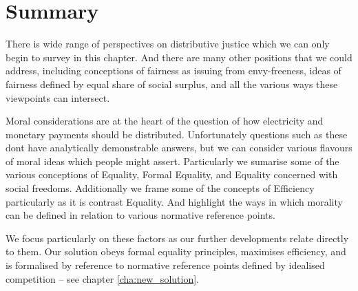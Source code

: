 \section{Summary}

There is wide range of perspectives on distributive justice which we can only begin to survey in this chapter.
And there are many other positions that we could address, including conceptions of fairness as issuing from envy-freeness, ideas of fairness defined by equal share of social surplus, and all the various ways these viewpoints can intersect.%

Moral considerations are at the heart of the question of how electricity and monetary payments should be distributed.
Unfortunately questions such as these dont have analytically demonstrable answers, but we can consider various flavours of moral ideas which people might assert.
Particularly we sumarise some of the various conceptions of Equality, Formal Equality, and Equality concerned with social freedoms.
Additionally we frame some of the concepts of Efficiency particularly as it is contrast Equality.
And highlight the ways in which morality can be defined in relation to various normative reference points.

We focus particularly on these factors as our further developments relate directly to them.
Our solution obeys formal equality principles, maximises efficiency, and is formalised by reference to normative reference points defined by idealised competition -- see chapter \ref{cha:new_solution}.




